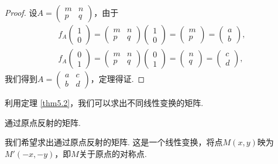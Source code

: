\begin{proof}
  设$A=\begin{pmatrix}
    m & n \\
    p & q
  \end{pmatrix}$，由于
  \begin{gather*}
    f_A\begin{pmatrix}
      1 \\
      0
    \end{pmatrix} =\begin{pmatrix}
    m & n \\
    p & q
  \end{pmatrix}\begin{pmatrix}
    1 \\
    0
  \end{pmatrix} =
  \begin{pmatrix}
    m \\
    p
  \end{pmatrix} =
  \begin{pmatrix}
    a \\
    b
  \end{pmatrix}, \\
  f_A\begin{pmatrix}
      0 \\
      1
    \end{pmatrix} =\begin{pmatrix}
    m & n \\
    p & q
  \end{pmatrix}\begin{pmatrix}
    0 \\
    1
  \end{pmatrix} =
  \begin{pmatrix}
    n \\
    q
  \end{pmatrix} =
  \begin{pmatrix}
    c \\
    d
  \end{pmatrix},
  \end{gather*}
  我们得到$A=\begin{pmatrix}
    a & c \\
    b & d
  \end{pmatrix}$，定理得证.
\end{proof}

利用定理 \ref{thm5.2}，我们可以求出不同线性变换的矩阵.

{\noindent\kaishu 通过原点反射的矩阵.}

我们希望求出通过原点反射的矩阵. 这是一个线性变换，将点$M(x,y)$映为$M'(-x,-y)$，即$M$关于原点的对称点.


